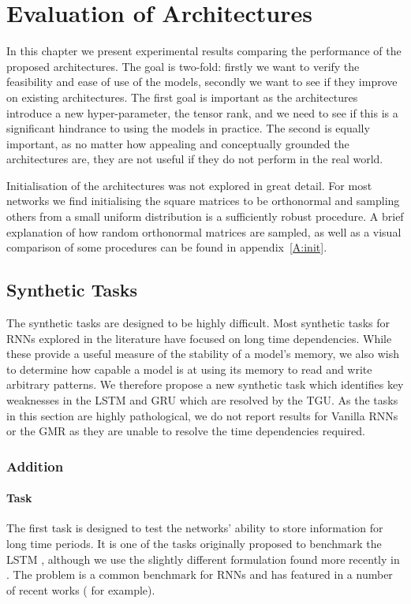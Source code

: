 
\chapter{Evaluation of Architectures}\label{C:exps}
In this chapter we present experimental results comparing the performance of the proposed architectures.
The goal is two-fold: firstly we want to verify the feasibility and ease of use of the models, secondly
we want to see if they improve on existing architectures. The first goal is
important as the architectures introduce a new hyper-parameter, the tensor rank, and we need to see if
this is a significant hindrance to using the models in practice. The second is equally important, as no
matter how appealing and conceptually grounded the architectures are, they are not useful if they do
not perform in the real world.

Initialisation of the architectures was not explored in great detail. For most networks we
find initialising the square matrices to be orthonormal and sampling others from a small uniform
distribution is a sufficiently robust procedure. A brief explanation of how random orthonormal
matrices are sampled, as well as a visual comparison of some procedures can be found in
appendix~\ref{A:init}.

\section{Synthetic Tasks}
The synthetic tasks are designed to be highly difficult. Most synthetic tasks for RNNs explored in
the literature have focused on long time dependencies. While these provide a useful measure of the
stability of a model's memory, we also wish to determine how capable a model is at using its memory to
read and write arbitrary patterns. We therefore propose a new synthetic task which identifies
key weaknesses in the LSTM and GRU which are resolved by the TGU. As the tasks in this section are
highly pathological, we do not report results for Vanilla RNNs or the GMR as they are unable to resolve
the time dependencies required.

\subsection{Addition}\label{sec:addition}
\subsubsection{Task}
The first task is designed to test the networks' ability to store information for long time periods. It is one
of the tasks originally proposed to benchmark the LSTM
\autocite{Hochreiter1997}, although we use the slightly different formulation found more 
recently in \autocite{Le2015}. The problem is a common benchmark for RNNs and has featured in a number of
recent works (\autocite{Arjovsky2015, Henaff2016, Barone2016, Neyshabur2016} for example).

